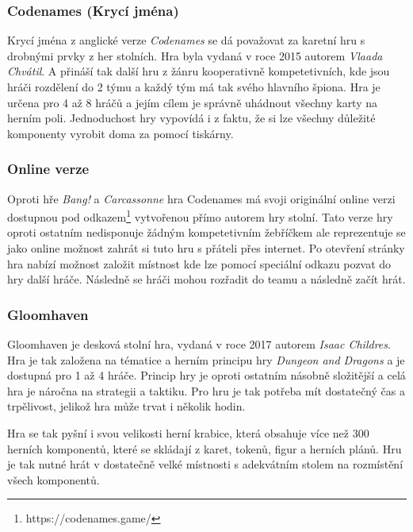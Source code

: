 \subsubsection{Codenames (Krycí jména)}
\label{subsubsec:popular-board-games-analysis-codenames}
Krycí jména z anglické verze \textit{Codenames} se dá považovat za karetní hru s drobnými prvky z her stolních. Hra byla vydaná v roce 2015 autorem \textit{Vlaada Chvátil}. A přináší tak další hru z žánru kooperativně kompetetivních, kde jsou hráči rozdělení do 2 týmu a každý tým má tak svého hlavního špiona. Hra je určena pro 4 až 8 hráčů a jejím cílem je správně uhádnout všechny karty na herním poli. Jednoduchost hry vypovídá i z faktu, že si lze všechny důležité komponenty vyrobit doma za pomocí tiskárny.

\subsubsection*{Online verze}
\label{subsubsec:popular-board-games-analysis-codenames-online}
Oproti hře \textit{Bang!} a \textit{Carcassonne} hra Codenames má svoji originální online verzi dostupnou pod odkazem\footnote{https://codenames.game/} vytvořenou přímo autorem hry stolní. Tato verze hry oproti ostatním nedisponuje žádným kompetetivním žebříčkem ale reprezentuje se jako online možnost zahrát si tuto hru s přáteli přes internet. Po otevření stránky hra nabízí možnost založit místnost kde lze pomocí speciální odkazu pozvat do hry další hráče. Následně se hráči mohou rozřadit do teamu a následně začít hrát.

\subsubsection{Gloomhaven}
\label{subsubsec:popular-board-games-analysis-gloomhaven}
Gloomhaven je desková stolní hra, vydaná v roce 2017 autorem \textit{Isaac Childres}. Hra je tak založena na tématice a herním principu hry \textit{Dungeon and Dragons} a je dostupná pro 1 až 4 hráče. Princip hry je oproti ostatním násobně složitější a celá hra je náročna na strategii a taktiku. Pro hru je tak potřeba mít dostatečný čas a trpělivost, jelikož hra může trvat i několik hodin.

Hra se tak pyšní i svou velikosti herní krabice, která obsahuje více než 300 herních komponentů, které se skládají z karet, tokenů, figur a herních plánů. Hru je tak nutné hrát v dostatečně velké místnosti s adekvátním stolem na rozmístění všech komponentů.

